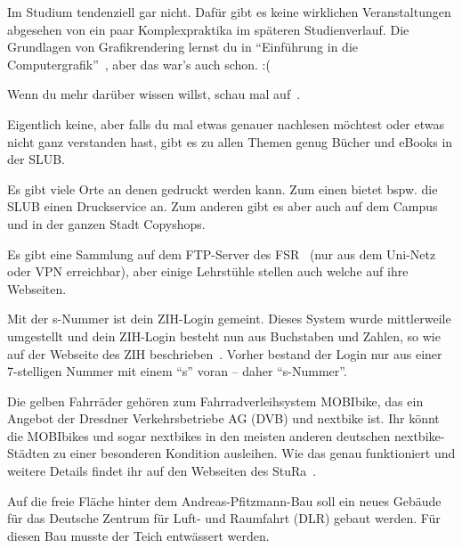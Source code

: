 Im Studium tendenziell gar nicht. Dafür gibt es keine wirklichen Veranstaltungen abgesehen von ein paar Komplexpraktika im späteren Studienverlauf. Die Grundlagen von Grafikrendering lernst du in \enquote{Einführung in die Computergrafik}~, aber das war's auch schon. :(

\label{minisec:faq}
Wenn du mehr darüber wissen willst, schau mal auf~.

Eigentlich keine, aber falls du mal etwas genauer nachlesen möchtest oder etwas nicht ganz verstanden hast, gibt es zu allen Themen genug Bücher und eBooks in der SLUB.~

Es gibt viele Orte an denen gedruckt werden kann. Zum einen bietet bspw. die SLUB einen Druckservice an. Zum anderen gibt es aber auch auf dem Campus und in der ganzen Stadt Copyshops.

Es gibt eine Sammlung auf dem FTP-Server des FSR~ (nur aus dem Uni-Netz oder VPN erreichbar), aber einige Lehrstühle stellen auch welche auf ihre Webseiten.

Mit der s-Nummer ist dein ZIH-Login gemeint. Dieses System wurde mittlerweile umgestellt und dein ZIH-Login besteht nun aus Buchstaben und Zahlen, so wie auf der Webseite des ZIH beschrieben~. Vorher bestand der Login nur aus einer 7-stelligen Nummer mit einem \enquote{s} voran -- daher \enquote{s-Nummer}.

Die gelben Fahrräder gehören zum Fahrradverleihsystem MOBIbike, das ein Angebot der Dresdner Verkehrsbetriebe AG (DVB) und nextbike ist. Ihr könnt die MOBIbikes und sogar nextbikes in den meisten anderen deutschen nextbike-Städten zu einer besonderen Kondition ausleihen. Wie das genau funktioniert und weitere Details findet ihr auf den Webseiten des StuRa~.

Auf die freie Fläche hinter dem Andreas-Pfitzmann-Bau soll ein neues Gebäude für das Deutsche Zentrum für Luft- und Raumfahrt (DLR) gebaut werden. Für diesen Bau musste der Teich entwässert werden.~
